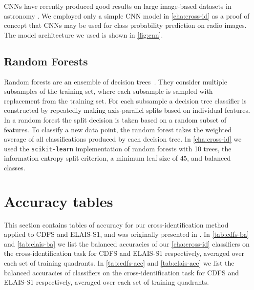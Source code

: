     CNNs have recently produced good results on large image-based datasets in
    astronomy \citep[e.g.]{lukic18compact, dieleman15cnn}. We employed
    only a simple CNN model in \autoref{cha:cross-id} as a proof of concept that CNNs may
    be used for class probability prediction on radio images. The model
    architecture we used is shown in \autoref{fig:cnn}.

  \subsection{Random Forests}
  \label{sec:atlas-random-forests}

    Random forests are an ensemble of decision
    trees~\citep{breiman01random-forest}. They consider multiple subsamples of
    the training set, where each subsample is sampled with replacement from
    the training set. For each subsample a decision tree classifier is
    constructed by repeatedly making axis-parallel splits based on individual
    features. In a random forest the split decision is taken based on a random
    subset of features. To classify a new data point, the random forest takes
    the weighted average of all classifications produced by each decision
    tree. {In \autoref{cha:cross-id} we used the \texttt{scikit-learn} \citep{pedregosa11sklearn}
    implementation of random forests with 10 trees, the information entropy
    split criterion, a minimum leaf size of 45, and balanced classes}.

\section{Accuracy tables}\label{sec:atlas-xid-accuracies}
  
  This section contains tables of accuracy for our cross-identification method applied to CDFS and
  ELAIS-S1, and was originally presented in \citet{alger18radio}. In \autoref{tab:cdfs-ba} and \autoref{tab:elais-ba} we list the
  balanced accuracies of our \autoref{cha:cross-id} classifiers on the cross-identification task for CDFS
  and ELAIS-S1 respectively, averaged over each set of training quadrants. In
  \autoref{tab:cdfs-acc} and \autoref{tab:elais-acc} we list the balanced
  accuracies of classifiers on the cross-identification task for CDFS and
  ELAIS-S1 respectively, averaged over each set of training quadrants.

